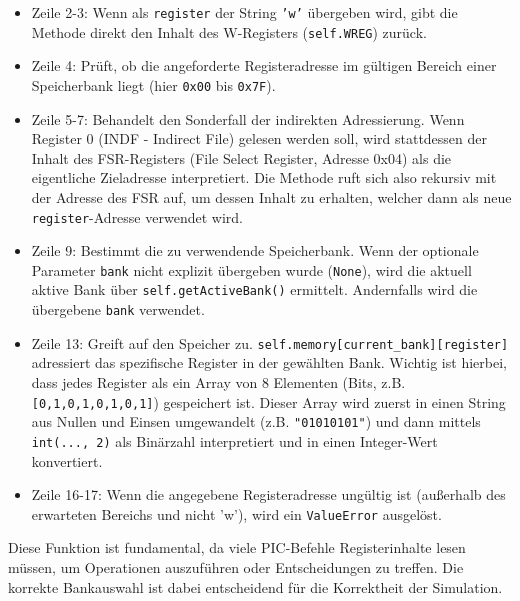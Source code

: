 \begin{itemize}
    \item Zeile 2-3: Wenn als \texttt{register} der String \texttt{'w'} übergeben wird, gibt die Methode direkt den Inhalt des W-Registers (\texttt{self.WREG}) zurück.
    \item Zeile 4: Prüft, ob die angeforderte Registeradresse im gültigen Bereich einer Speicherbank liegt (hier \texttt{0x00} bis \texttt{0x7F}).
    \item Zeile 5-7: Behandelt den Sonderfall der indirekten Adressierung. Wenn Register 0 (INDF - Indirect File) gelesen werden soll, wird stattdessen der Inhalt des FSR-Registers (File Select Register, Adresse 0x04) als die eigentliche Zieladresse interpretiert. Die Methode ruft sich also rekursiv mit der Adresse des FSR auf, um dessen Inhalt zu erhalten, welcher dann als neue \texttt{register}-Adresse verwendet wird.
    \item Zeile 9: Bestimmt die zu verwendende Speicherbank. Wenn der optionale Parameter \texttt{bank} nicht explizit übergeben wurde (\texttt{None}), wird die aktuell aktive Bank über \texttt{self.getActiveBank()} ermittelt. Andernfalls wird die übergebene \texttt{bank} verwendet.
    \item Zeile 13: Greift auf den Speicher zu. \texttt{self.memory[current\_bank][register]} adressiert das spezifische Register in der gewählten Bank. Wichtig ist hierbei, dass jedes Register als ein Array von 8 Elementen (Bits, z.B. \texttt{[0,1,0,1,0,1,0,1]}) gespeichert ist. Dieser Array wird zuerst in einen String aus Nullen und Einsen umgewandelt (z.B. \texttt{"01010101"}) und dann mittels \texttt{int(..., 2)} als Binärzahl interpretiert und in einen Integer-Wert konvertiert.
    \item Zeile 16-17: Wenn die angegebene Registeradresse ungültig ist (außerhalb des erwarteten Bereichs und nicht 'w'), wird ein \texttt{ValueError} ausgelöst.
\end{itemize}
Diese Funktion ist fundamental, da viele PIC-Befehle Registerinhalte lesen müssen, um Operationen auszuführen oder Entscheidungen zu treffen. Die korrekte Bankauswahl ist dabei entscheidend für die Korrektheit der Simulation.